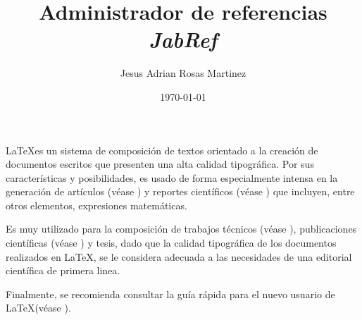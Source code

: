 \documentclass[12pt]{article}
\title{Administrador de referencias \emph{JabRef}}
\author{Jesus Adrian Rosas Martinez}
\date{\small{\today}}
\begin{document}
\maketitle %

\LaTeX es un sistema de composición de textos orientado a la creación de documentos escritos que presenten una alta calidad tipográfica. Por sus características y posibilidades, es usado de forma especialmente intensa en la generación de artículos (véase \cite{li1975bases}) y reportes científicos (véase \cite{zuber1959hydrodynamic}) que incluyen, entre otros elementos, expresiones matemáticas.

Es muy utilizado para la composición de trabajos técnicos (véase \cite{gianturco2012migracion}), publicaciones científicas (véase \cite{alarcon2010publicaciones}) y tesis, dado que la calidad tipográfica de los documentos realizados en \LaTeX, se le considera adecuada a las necesidades de una editorial científica de primera linea.

Finalmente, se recomienda consultar la guía rápida para el nuevo usuario de \LaTeX (véase \cite{martel2004guia}).



\end{document}
